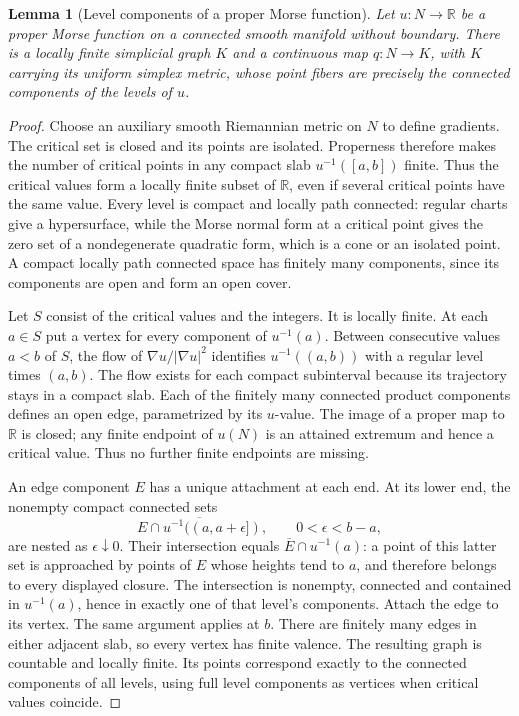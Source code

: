 \documentclass[11pt]{article}
\numberwithin{equation}{section}
\newtheorem{lemma}[theorem]{Lemma}
\theoremstyle{definition}
\theoremstyle{remark}
\begin{document}
\begin{lemma}[Level components of a proper Morse function]
\label{cover:reeb}
Let $u:N\to\mathbb R$ be a proper Morse function on a connected smooth
manifold without boundary.  There is a locally finite simplicial graph $K$ and a
continuous map $q:N\to K$, with $K$ carrying its uniform simplex
metric, whose point fibers are precisely the connected components
of the levels of $u$.
\end{lemma}
\begin{proof}
Choose an auxiliary smooth Riemannian metric on $N$ to define gradients.
The critical set is closed and its points are isolated.  Properness
therefore makes the number of critical points in any compact slab
$u^{-1}([a,b])$ finite.  Thus the critical values form a locally finite
subset of $\mathbb R$, even if several critical points have the same value.
Every level is compact and locally path connected: regular charts
give a hypersurface, while the Morse normal form at a critical point
gives the zero set of a nondegenerate quadratic form, which is a cone
or an isolated point.  A compact locally path connected space has finitely
many components, since its components are open and form an open cover.

Let $S$ consist of the critical values and the integers.  It is
locally finite.  At each $a\in S$ put a vertex for every component
of $u^{-1}(a)$.  Between consecutive values $a<b$ of $S$, the flow of
$\nabla u/|\nabla u|^2$ identifies $u^{-1}((a,b))$ with a regular
level times $(a,b)$.  The flow exists for each compact subinterval
because its trajectory stays in a compact slab.  Each of the finitely
many connected product components defines an open edge, parametrized
by its $u$-value.  The image of a proper map to $\mathbb R$ is closed;
any finite endpoint of $u(N)$ is an attained extremum and hence a
critical value.  Thus no further finite endpoints are missing.

An edge component $E$ has a unique attachment at each end.  At its
lower end, the nonempty compact connected sets
\[
 \overline{E\cap u^{-1}((a,a+\epsilon])},
 \qquad 0<\epsilon<b-a,
\]
are nested as $\epsilon\downarrow0$.  Their intersection equals
$\overline E\cap u^{-1}(a)$: a point of this latter set is approached
by points of $E$ whose heights tend to $a$, and therefore belongs
to every displayed closure.  The intersection is nonempty,
connected and contained in $u^{-1}(a)$, hence in exactly one of that
level's components.  Attach the edge to its vertex.  The same argument
applies at $b$.  There are finitely many edges in either adjacent slab,
so every vertex has finite valence.  The resulting graph is countable
and locally finite.  Its points correspond exactly to the connected
components of all levels, using full level components as vertices
when critical values coincide.


\end{proof}
\end{document}
